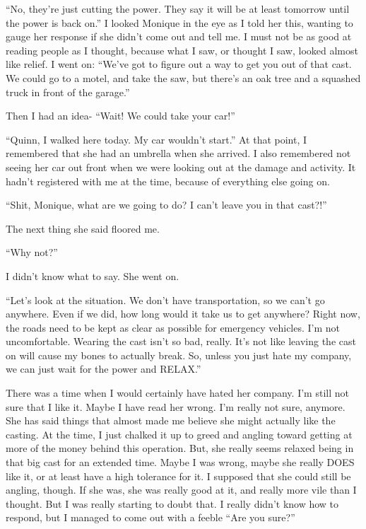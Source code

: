 ``No, they're just cutting the power. They say it will be at least tomorrow until the power
is back on.'' I looked Monique in the eye as I told her this, wanting to gauge her response if
she didn't come out and tell me. I must not be as good at reading people as I thought, because
what I saw, or thought I saw, looked almost like relief. I went on: ``We've got to figure out a
way to get you out of that cast. We could go to a motel, and take the saw, but there's an oak
tree and a squashed truck in front of the garage.''

Then I had an idea- ``Wait! We could take your car!''

``Quinn, I walked here today. My car wouldn't start.'' At that point, I remembered that she
had an umbrella when she arrived. I also remembered not seeing her car out front when we were
looking out at the damage and activity. It hadn't registered with me at the time, because of
everything else going on.

``Shit, Monique, what are we going to do? I can't leave you in that cast?!''

The next thing she said floored me.

``Why not?''

I didn't know what to say. She went on.

``Let's look at the situation. We don't have transportation, so we can't go anywhere. Even
if we did, how long would it take us to get anywhere? Right now, the roads need to be kept as
clear as possible for emergency vehicles. I'm not uncomfortable. Wearing the cast isn't so bad,
really. It's not like leaving the cast on will cause my bones to actually break. So, unless you
just hate my company, we can just wait for the power and RELAX.''

There was a time when I would certainly have hated her company. I'm still not sure that I
like it. Maybe I have read her wrong. I'm really not sure, anymore. She has said things that
almost made me believe she might actually like the casting. At the time, I just chalked it up to
greed and angling toward getting at more of the money behind this operation. But, she really
seems relaxed being in that big cast for an extended time. Maybe I was wrong, maybe she really
DOES like it, or at least have a high tolerance for it. I supposed that she could still be
angling, though. If she was, she was really good at it, and really more vile than I thought. But
I was really starting to doubt that. I really didn't know how to respond, but I managed to come
out with a feeble ``Are you sure?''

